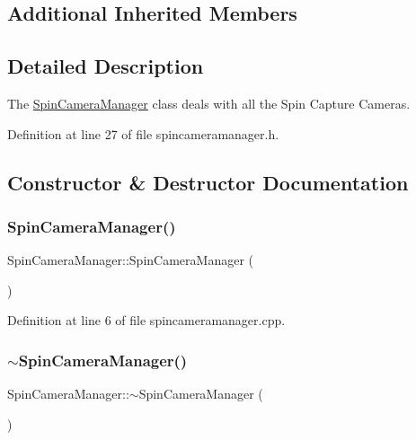 \subsection*{Additional Inherited Members}


\subsection{Detailed Description}
The \mbox{\hyperlink{class_spin_camera_manager}{Spin\+Camera\+Manager}} class deals with all the Spin Capture Cameras. 

Definition at line 27 of file spincameramanager.\+h.



\subsection{Constructor \& Destructor Documentation}
\mbox{\label{class_spin_camera_manager_a8931fe8336705233c818f216f0e0d235}} 
\subsubsection{\texorpdfstring{SpinCameraManager()}{SpinCameraManager()}}
{\footnotesize\ttfamily Spin\+Camera\+Manager\+::\+Spin\+Camera\+Manager (\begin{DoxyParamCaption}{ }\end{DoxyParamCaption})}



Definition at line 6 of file spincameramanager.\+cpp.

\mbox{\label{class_spin_camera_manager_a1e1e60eb35671a981b884dde99484253}} 
\subsubsection{\texorpdfstring{$\sim$SpinCameraManager()}{~SpinCameraManager()}}
{\footnotesize\ttfamily Spin\+Camera\+Manager\+::$\sim$\+Spin\+Camera\+Manager (\begin{DoxyParamCaption}{ }\end{DoxyParamCaption})}



